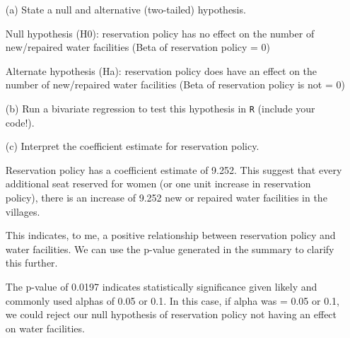 \documentclass[12pt,letterpaper]{article}
\begin{document}
\newpage
\begin{enumerate}
	\item [(a)] State a null and alternative (two-tailed) hypothesis. 
	\vspace{0.5cm}
	
	Null hypothesis (H0): reservation policy has no effect on the number of new/repaired water facilities (Beta of reservation policy = 0)
	
	Alternate hypothesis (Ha): reservation policy does have an effect on the number of new/repaired water facilities (Beta of reservation policy is not = 0)
	
	\vspace{0.5cm}
	\item [(b)] Run a bivariate regression to test this hypothesis in \texttt{R} (include your code!).
	\vspace{0.5cm}
	
	
	
	\vspace{0.5cm}
	\item [(c)] Interpret the coefficient estimate for reservation policy. 
	
		
		
	Reservation policy has a coefficient estimate of 9.252. This suggest that every additional seat reserved for women (or one unit increase in reservation policy), there is an increase of 9.252 new or repaired water facilities in the villages.
	
	This indicates, to me, a positive relationship between reservation policy and water facilities. We can use the p-value generated in the summary to clarify this further.
	
	The p-value of 0.0197 indicates statistically significance given likely and commonly used alphas of 0.05 or 0.1. In this case, if alpha was = 0.05 or 0.1, we could reject our null hypothesis of reservation policy not having an effect on water facilities.
	
		
		
\end{enumerate}
\end{document}

